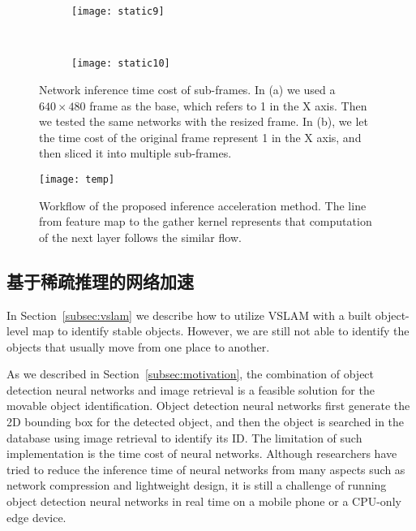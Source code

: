 \begin{figure}[t]
	\centering
	\begin{subfigure}{.48\linewidth}
		\texttt{[image: static9]}
		\caption{}
	\end{subfigure}
	\ 
	\begin{subfigure}{.48\linewidth}
		\texttt{[image: static10]}
		\caption{}
	\end{subfigure}
	\caption{Network inference time cost of sub-frames. In (a) we used a $640\times 480$ frame as the base, which refers to 1 in the X axis. Then we tested the same networks with the resized frame. In (b), we let the time cost of the original frame represent 1 in the X axis, and then sliced it into multiple sub-frames. }\label{fig:subframetime}
\end{figure}


\begin{figure}[t]
	\centering
	\texttt{[image: temp]}
	\caption{Workflow of the proposed inference acceleration method. The line from feature map to the gather kernel represents that computation of the next layer follows the similar flow.}
	\label{fig:sparse-conv}
\end{figure}


\subsection{基于稀疏推理的网络加速}\label{sub:Sparse Object Detection}
In Section~\ref{subsec:vslam} we describe how to utilize VSLAM with a built object-level map to identify stable objects. However, we are still not able to identify the objects that usually move from one place to another.

As we described in Section~\ref{subsec:motivation}, the combination of object detection neural networks and image retrieval is a feasible solution for the movable object identification.
Object detection neural networks first generate the 2D bounding box for the detected object, and then the object is searched in the database using image retrieval to identify its ID.
The limitation of such implementation is the time cost of neural networks. 
Although researchers have tried to reduce the inference time of neural networks from many aspects such as network compression and  lightweight design, it is still a challenge of running object detection neural networks in real time on a mobile phone or a CPU-only edge device.

